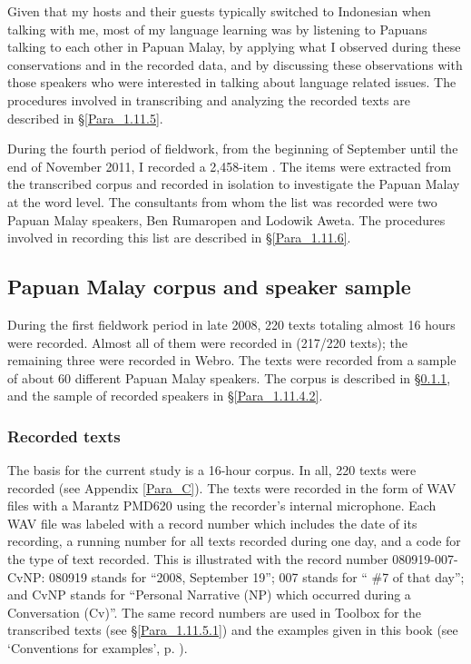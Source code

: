 {Given that my hosts and their guests typically switched to Indonesian when talking with me, most of my language learning was by listening to Papuans talking to each other in Papuan Malay, by applying what I observed during these conservations and in the recorded data, and by discussing these observations with those speakers who were interested in talking about language related issues. The procedures involved in transcribing and analyzing the recorded texts are described in §\ref{Para_1.11.5}.



During the fourth period of fieldwork, from the beginning of September until the end of November 2011, I recorded a 2,458-item  \citep{Kluge.2014}. The items were extracted from the transcribed corpus and recorded in isolation to investigate the Papuan Malay  at the word level. The consultants from whom the list was recorded were two Papuan Malay speakers, Ben Rumaropen and Lodowik Aweta. The procedures involved in recording this list are described in §\ref{Para_1.11.6}. 


\subsection{Papuan Malay corpus and speaker sample}\label{Para_1.11.4}
During the first fieldwork period in late 2008, 220 texts totaling almost 16 hours were recorded. Almost all of them were recorded in  (217/220 texts); the remaining three were recorded in Webro. The texts were recorded from a sample of about 60 different Papuan Malay speakers. The corpus is described in §\ref{Para_1.11.4.1}, and the sample of recorded speakers in §\ref{Para_1.11.4.2}.


\subsubsection[Recorded texts]{Recorded texts}
\label{Para_1.11.4.1}
The basis for the current study is a 16-hour corpus. In all, 220 texts were recorded (see Appendix \ref{Para_C}). The texts were recorded in the form of WAV files with a Marantz PMD620 using the recorder’s internal microphone. Each WAV file was labeled with a record number which includes the date of its recording, a running number for all texts recorded during one day, and a code for the type of text recorded. This is illustrated with the record number 080919-007-CvNP: 080919 stands for  ``2008, September 19''; 007 stands for  `` \#7 of that day''; and CvNP stands for  ``Personal Narrative (NP) which occurred during a Conversation (Cv)''. The same record numbers are used in Toolbox for the transcribed texts (see §\ref{Para_1.11.5.1}) and the examples given in this book (see ‘Conventions for examples’, p. \pageref{Para_0}).

}
